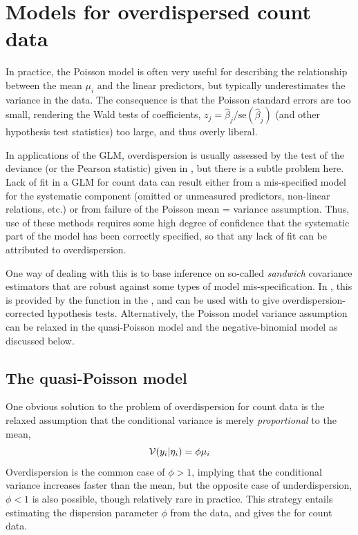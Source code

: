 \documentclass[11pt]{book}\usepackage[]{graphicx}\usepackage[]{color}
\begin{document}
\section{Models for overdispersed count data}\label{sec:glm-overdisp}

In practice, the Poisson model is often very useful for describing the
relationship between the mean $\mu_i$ and the linear predictors,
but typically underestimates the variance in the data.
The consequence is that the Poisson standard errors are too small,
rendering the Wald tests of coefficients, $z_j = \widehat{\beta}_j / \mathrm{se} (\widehat{\beta}_j) $
(and other hypothesis test statistics)
too large, and thus overly liberal.

In applications of the GLM, overdispersion is usually assessed by the \LR
test of the deviance (or the Pearson statistic) given in ,
but there is a subtle problem here. Lack of fit in a GLM for count data can result
either from a mis-specified model for the systematic component
(omitted or unmeasured predictors, non-linear relations, etc.)
or from failure of the Poisson mean = variance assumption.
Thus, use of these methods requires some high degree of confidence that the
systematic part of the model has been correctly specified, so that any
lack of fit can be attributed to overdispersion.

One way of dealing with this is to base inference on
so-called \emph{sandwich} covariance estimators that are robust against
some types of model mis-specification.  In \R, this is provided by the
 function in the , and can be used
with  to give overdispersion-corrected
hypothesis tests.
Alternatively, the Poisson model variance assumption can be relaxed
in the quasi-Poisson model and the negative-binomial model as
discussed below.


\subsection{The quasi-Poisson model}\label{sec:glm-quasi}

One obvious solution to the problem of overdispersion for count data is the relaxed assumption
that the conditional variance is merely \emph{proportional} to the mean,
\begin{equation*}
\mathcal{V} (y_i | \eta_i) = \phi \mu_i
\end{equation*}
Overdispersion is the common case of $\phi > 1$, implying that the conditional variance
increases faster than the mean, but the opposite case of underdispersion, $\phi < 1$
is also possible, though relatively rare in practice.
This strategy entails estimating the dispersion parameter $\phi$ from the data,
and gives the  for count data.
\end{document}
